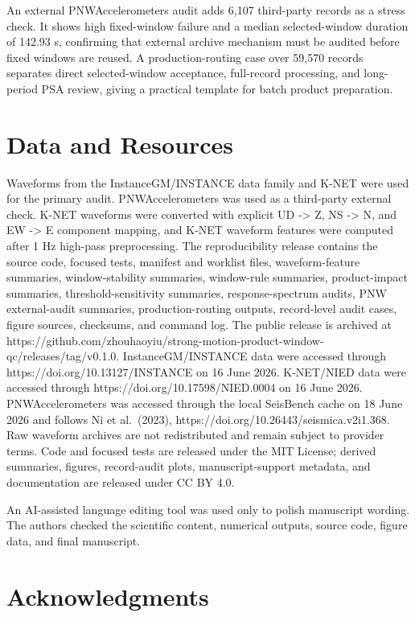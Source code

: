 \documentclass[12pt,letterpaper]{article}
\begin{document}
An external PNWAccelerometers audit adds 6,107 third-party records as a stress check. It shows high fixed-window failure and a median selected-window duration of 142.93 s, confirming that external archive mechanism must be audited before fixed windows are reused. A production-routing case over 59,570 records separates direct selected-window acceptance, full-record processing, and long-period PSA review, giving a practical template for batch product preparation.

\section{Data and Resources}\label{data-and-resources}

Waveforms from the InstanceGM/INSTANCE data family and K-NET were used for the primary audit. PNWAccelerometers was used as a third-party external check. K-NET waveforms were converted with explicit UD -\textgreater{} Z, NS -\textgreater{} N, and EW -\textgreater{} E component mapping, and K-NET waveform features were computed after 1 Hz high-pass preprocessing. The reproducibility release contains the source code, focused tests, manifest and worklist files, waveform-feature summaries, window-stability summaries, window-rule summaries, product-impact summaries, threshold-sensitivity summaries, response-spectrum audits, PNW external-audit summaries, production-routing outputs, record-level audit cases, figure sources, checksums, and command log. The public release is archived at https://github.com/zhouhaoyiu/strong-motion-product-window-qc/releases/tag/v0.1.0. InstanceGM/INSTANCE data were accessed through https://doi.org/10.13127/INSTANCE on 16 June 2026. K-NET/NIED data were accessed through https://doi.org/10.17598/NIED.0004 on 16 June 2026. PNWAccelerometers was accessed through the local SeisBench cache on 18 June 2026 and follows Ni et al.~(2023), https://doi.org/10.26443/seismica.v2i1.368. Raw waveform archives are not redistributed and remain subject to provider terms. Code and focused tests are released under the MIT License; derived summaries, figures, record-audit plots, manuscript-support metadata, and documentation are released under CC BY 4.0.

An AI-assisted language editing tool was used only to polish manuscript wording. The authors checked the scientific content, numerical outputs, source code, figure data, and final manuscript.

\section{Acknowledgments}\label{acknowledgments}
\end{document}
